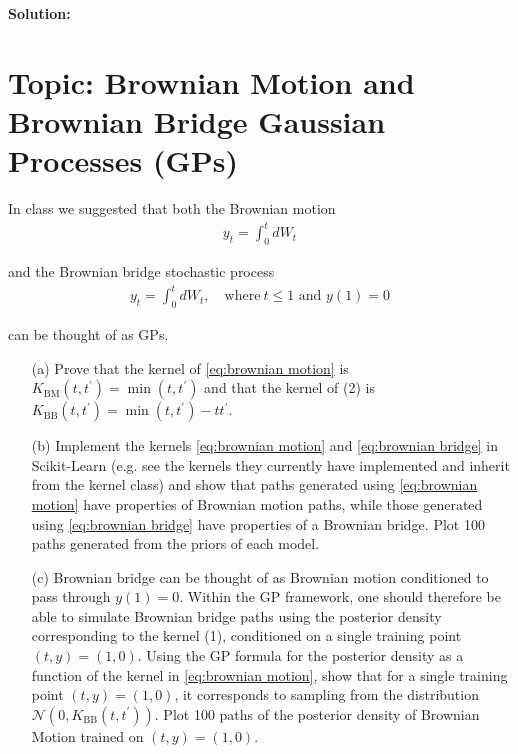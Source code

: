 \documentclass[11pt]{article}
\theoremstyle{plain} %
\newenvironment{solution}
{\color{C2}\normalfont\begin{framed}\begingroup\textbf{Solution:} }
  {\endgroup\end{framed}}
\theoremstyle{remark}
\begin{document}
\begin{solution}

\end{solution}


\section{Topic: Brownian Motion and Brownian Bridge Gaussian Processes (GPs)}

In class we suggested that both the Brownian motion
\begin{align}
  y_{t}=\int_{0}^{t} d W_{t} \label{eq:brownian motion}
\end{align}


and the Brownian bridge stochastic process
\begin{align}
y_{t}=\int_{0}^{t} d W_{t}, \quad \text{where} \ t \leq 1 \text{ and } y(1)=0
\label{eq:brownian bridge}
\end{align}

can be thought of as GPs.

\begin{enumerate}
    \item[(a)] Prove that the kernel of \cref{eq:brownian motion} is \( K_{\mathrm{BM}}\left(t,
    t^{\prime}\right)=\min \left(t, t^{\prime}\right) \) and that the kernel of
    (2) is \( K_{\mathrm{BB}}\left(t, t^{\prime}\right)=\min \left(t,
    t^{\prime}\right)-t t^{\prime} \).
    
    \item[(b)] Implement the kernels \cref{eq:brownian motion} and \cref{eq:brownian bridge} in Scikit-Learn (e.g. see the
    kernels they currently have implemented and inherit from the kernel class)
    and show that paths generated using \cref{eq:brownian motion} have properties of Brownian motion
    paths, while those generated using \cref{eq:brownian bridge} have properties of a Brownian bridge.
    Plot 100 paths generated from the priors of each model.
    
    \item[(c)] Brownian bridge can be thought of as Brownian motion conditioned
    to pass through \( y(1)=0 \). Within the GP framework, one should therefore
    be able to simulate Brownian bridge paths using the posterior density
    corresponding to the kernel (1), conditioned on a single training point \(
    (t, y)=(1,0) \). Using the GP formula for the posterior density as a
    function of the kernel in \cref{eq:brownian motion}, show that for a single training point \( (t,
    y)=(1,0) \), it corresponds to sampling from the distribution \(
    \mathcal{N}\left(0, K_{\mathrm{BB}}\left(t, t^{\prime}\right)\right) \).
    Plot 100 paths of the posterior density of Brownian Motion trained on \( (t,
    y)=(1,0) \).
\end{enumerate}
\end{document}
